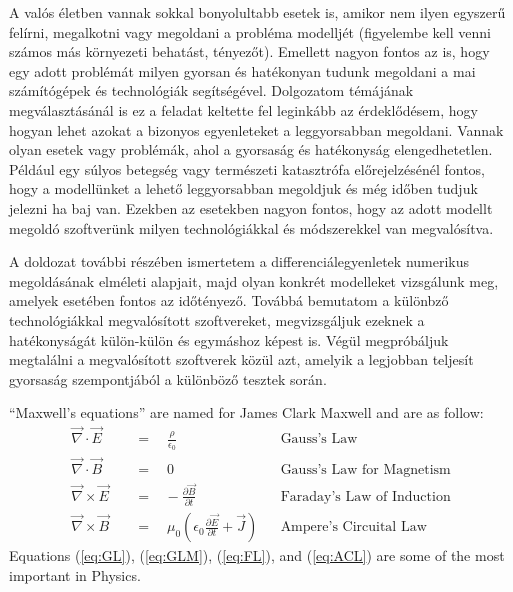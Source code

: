 A valós életben vannak sokkal bonyolultabb esetek is, amikor nem ilyen egyszerű felírni, megalkotni vagy megoldani a probléma modelljét (figyelembe kell venni számos más környezeti behatást, tényezőt). Emellett nagyon fontos az is, hogy egy adott problémát milyen gyorsan és hatékonyan tudunk megoldani a mai számítógépek és technológiák segítségével. Dolgozatom témájának megválasztásánál is ez a feladat keltette fel leginkább az érdeklődésem, hogy hogyan lehet azokat a bizonyos egyenleteket a leggyorsabban megoldani. Vannak olyan esetek vagy problémák, ahol a gyorsaság és hatékonyság elengedhetetlen. Például egy súlyos betegség vagy természeti katasztrófa előrejelzésénél fontos, hogy a modellünket a lehető leggyorsabban megoldjuk és még időben tudjuk jelezni ha baj van. Ezekben az esetekben nagyon fontos, hogy az adott modellt megoldó szoftverünk milyen technológiákkal és módszerekkel van megvalósítva.

A doldozat további részében ismertetem a differenciálegyenletek numerikus megoldásának elméleti alapjait, majd olyan konkrét modelleket vizsgálunk meg, amelyek esetében fontos az időtényező. Továbbá bemutatom a különbző technológiákkal megvalósított szoftvereket, megvizsgáljuk ezeknek a hatékonyságát külön-külön és egymáshoz képest is. Végül megpróbáljuk megtalálni a megvalósított szoftverek közül azt, amelyik a legjobban teljesít gyorsaság szempontjából a különböző tesztek során. %
\cite{Knuth}


	``Maxwell's equations'' are named for James Clark Maxwell and are as follow:
\begin{align}             
	\vec{\nabla} \cdot \vec{E} \quad &=\quad\frac{\rho}{\epsilon_0} &&\text{Gauss's Law} \label{eq:GL}\\      
	\vec{\nabla} \cdot \vec{B} \quad &=\quad 0 &&\text{Gauss's Law for Magnetism} \label{eq:GLM}\\
	\vec{\nabla} \times \vec{E} \quad &=\hspace{10pt}-\frac{\partial{\vec{B}}}{\partial{t}} &&\text{Faraday's Law of Induction} \label{eq:FL}\\ 
	\vec{\nabla} \times \vec{B} \quad &=\quad \mu_0\left( \epsilon_0\frac{\partial{\vec{E}}}{\partial{t}}+\vec{J}\right) &&\text{Ampere's Circuital Law} \label{eq:ACL}
\end{align}
Equations (\ref{eq:GL}), (\ref{eq:GLM}), (\ref{eq:FL}), and (\ref{eq:ACL}) are some of the most important in Physics.
